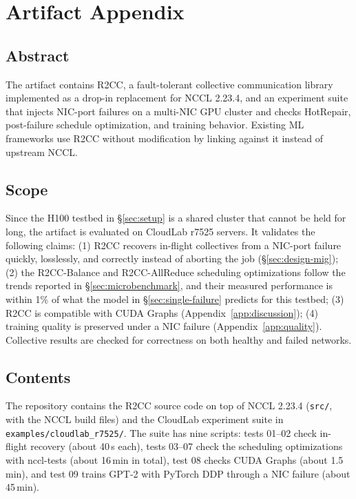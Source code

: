 \section{Artifact Appendix}\label{app:artifact}

\subsection*{Abstract}

The artifact contains R2CC, a fault-tolerant collective communication library implemented as a drop-in replacement for NCCL 2.23.4, and an experiment suite that injects NIC-port failures on a multi-NIC GPU cluster and checks HotRepair, post-failure schedule optimization, and training behavior. Existing ML frameworks use R2CC without modification by linking against it instead of upstream NCCL.

\subsection*{Scope}

Since the H100 testbed in \S\ref{sec:setup} is a shared cluster that cannot be held for long, the artifact is evaluated on CloudLab\cite{Duplyakin+:ATC19} r7525 servers. It validates the following claims:
(1) R2CC recovers in-flight collectives from a NIC-port failure quickly, losslessly, and correctly instead of aborting the job (\S\ref{sec:design-mig});
(2) the R2CC-Balance and R2CC-AllReduce scheduling optimizations follow the trends reported in \S\ref{sec:microbenchmark}, and their measured performance is within 1\% of what the model in \S\ref{sec:single-failure} predicts for this testbed;
(3) R2CC is compatible with CUDA Graphs (Appendix~\ref{app:discussion});
(4) training quality is preserved under a NIC failure (Appendix~\ref{app:quality}).
Collective results are checked for correctness on both healthy and failed networks.

\subsection*{Contents}

The repository contains the R2CC source code on top of NCCL 2.23.4 (\texttt{src/}, with the NCCL build files) and the CloudLab experiment suite in \texttt{examples/cloudlab\_r7525/}. The suite has nine scripts: tests 01--02 check in-flight recovery (about 40\,s each), tests 03--07 check the scheduling optimizations with nccl-tests (about 16\,min in total), test 08 checks CUDA Graphs (about 1.5\,min), and test 09 trains GPT-2 with PyTorch DDP through a NIC failure (about 45\,min).

